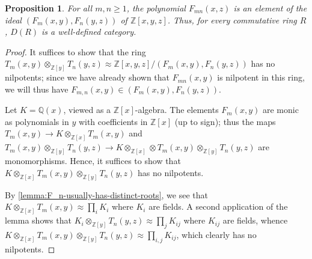 \documentclass[11pt]{amsart}
\numberwithin{equation}{section}
\theoremstyle{plain}
\newtheorem{prop}[subsection]{Proposition}
\theoremstyle{remark}
\theoremstyle{plain}
\begin{document}
\begin{prop}
  For all $m,n\geq1$, the polynomial $F_{mn}(x,z)$
  is an element of the ideal $(F_m(x,y),F_n(y,z))$ of ${\mathbb{Z}}[x,y,z]$.
  Thus, for every commutative ring $R$, $D(R)$ is a well-defined
  category. 
\end{prop}
\begin{proof}
It suffices to show that 
  the ring $T_m(x,y)\otimes_{{\mathbb{Z}}[y]}T_n(y,z) \approx
  {\mathbb{Z}}[x,y,z]/(F_m(x,y),F_n(y,z))$ has no nilpotents; since we have
  already shown that $F_{mn}(x,y)$ is nilpotent in this ring, we will
  thus have $F_{m,n}(x,y)\in (F_m(x,y),F_n(y,z))$. 

Let $K={\mathbb{Q}}(x)$,
  viewed as a ${\mathbb{Z}}[x]$-algebra.  
The elements
  $F_m(x,y)$ are monic as polynomials in $y$ with coefficients in
  ${\mathbb{Z}}[x]$ (up to sign); thus the maps $T_m(x,y){\rightarrow}
  K\otimes_{{\mathbb{Z}}[x]}T_m(x,y)$ and $T_m(x,y)\otimes_{{\mathbb{Z}}[y]}
  T_n(y,z){\rightarrow} K\otimes_{{\mathbb{Z}}[x]}\otimes
  T_m(x,y)\otimes_{{\mathbb{Z}}[y]}T_n(y,z)$ are monomorphisms.  Hence, it
  suffices to show that $K\otimes_{{\mathbb{Z}}[x]}T_m(x,y)\otimes_{{\mathbb{Z}}[y]}
  T_n(y,z)$ has no nilpotents.  

By \eqref{lemma:F_n-usually-has-distinct-roots}, we see that
$K\otimes_{{\mathbb{Z}}[x]} T_m(x,y)\approx 
\prod_iK_i$ where $K_i$ are fields.  A second application of the lemma shows
that $K_i\otimes_{{\mathbb{Z}}[y]} T_n(y,z)\approx \prod_j K_{ij}$ where
$K_{ij}$ are fields, whence
$K\otimes_{{\mathbb{Z}}[x]}T_m(x,y)\otimes_{{\mathbb{Z}}[y]}T_n(y,z)\approx
\prod_{i,j}K_{ij}$, which clearly has no nilpotents.
\end{proof}
\end{document}
